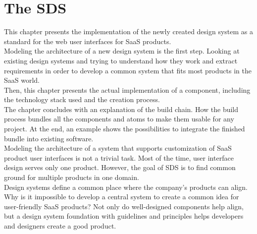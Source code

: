 \newpage
\section{The \acl{SDS}}
This chapter presents the implementation of the newly created design system as a standard for the web user interfaces for SaaS products. \\
Modeling the architecture of a new design system is the first step. Looking at existing design systems and trying to understand how they work and extract requirements in order to develop a common system that fits most products in the SaaS world. \\
Then, this chapter presents the actual implementation of a component, including the technology stack used and the creation process. \\
The chapter concludes with an explanation of the build chain. How the build process bundles all the components and atoms to make them usable for any project. At the end, an example shows the possibilities to integrate the finished bundle into existing software.\\
Modeling the architecture of a system that supports customization of SaaS product user interfaces is not a trivial task. Most of the time, user interface design serves only one product. However, the goal of \ac{SDS} is to find common ground for multiple products in one domain. \\
Design systems define a common place where the company's products can align. Why is it impossible to develop a central system to create a common idea for user-friendly SaaS products? Not only do well-designed components help align, but a design system foundation with guidelines and principles helps developers and designers create a good product. \\




